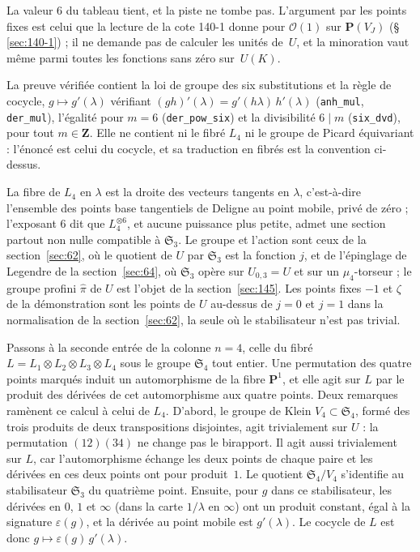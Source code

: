 \begin{remarque}
La valeur $6$ du tableau tient, et la piste ne tombe pas. L'argument par les points fixes est celui que la lecture de la cote 140-1 donne pour $\mathcal O(1)$ sur $\mathbf P(V_J)$ (§\,\ref{sec:140-1}) ; il ne demande pas de calculer les unités de~$U$, et la minoration vaut même parmi toutes les fonctions sans zéro sur~$U(K)$.
\end{remarque}

\noindent La preuve vérifiée contient la loi de groupe des six substitutions et la règle de cocycle, $g \mapsto g'(\lambda)$ vérifiant $(gh)'(\lambda) = g'(h\lambda)\,h'(\lambda)$ (\texttt{anh\_mul}, \texttt{der\_mul}), l'égalité pour $m = 6$ (\texttt{der\_pow\_six}) et la divisibilité $6 \mid m$ (\texttt{six\_dvd}), pour tout $m \in \mathbf Z$. Elle ne contient ni le fibré $L_4$ ni le groupe de Picard équivariant : l'énoncé est celui du cocycle, et sa traduction en fibrés est la convention ci-dessus.

\begin{remarque}
La fibre de $L_4$ en $\lambda$ est la droite des vecteurs tangents en $\lambda$, c'est-à-dire l'ensemble des points base tangentiels de Deligne \cite{deligne1989} au point mobile, privé de zéro ; l'exposant $6$ dit que $L_4^{\otimes 6}$, et aucune puissance plus petite, admet une section partout non nulle compatible à $\mathfrak S_3$. Le groupe et l'action sont ceux de la section~\ref{sec:62}, où le quotient de $U$ par $\mathfrak S_3$ est la fonction $j$, et de l'épinglage de Legendre de la section~\ref{sec:64}, où $\mathfrak S_3$ opère sur $U_{0,3} = U$ et sur un $\mu_4$-torseur ; le groupe profini $\hat\pi$ de $U$ est l'objet de la section~\ref{sec:145}. Les points fixes $-1$ et $\zeta$ de la démonstration sont les points de $U$ au-dessus de $j = 0$ et $j = 1$ dans la normalisation de la section~\ref{sec:62}, la seule où le stabilisateur n'est pas trivial.
\end{remarque}

Passons à la seconde entrée de la colonne $n = 4$, celle du fibré $L = L_1 \otimes L_2 \otimes L_3 \otimes L_4$ sous le groupe $\mathfrak S_4$ tout entier. Une permutation des quatre points marqués induit un automorphisme de la fibre $\mathbf P^1$, et elle agit sur $L$ par le produit des dérivées de cet automorphisme aux quatre points. Deux remarques ramènent ce calcul à celui de $L_4$. D'abord, le groupe de Klein $V_4 \subset \mathfrak S_4$, formé des trois produits de deux transpositions disjointes, agit trivialement sur $U$ : la permutation $(12)(34)$ ne change pas le birapport. Il agit aussi trivialement sur $L$, car l'automorphisme échange les deux points de chaque paire et les dérivées en ces deux points ont pour produit~$1$. Le quotient $\mathfrak S_4/V_4$ s'identifie au stabilisateur $\mathfrak S_3$ du quatrième point. Ensuite, pour $g$ dans ce stabilisateur, les dérivées en $0$, $1$ et $\infty$ (dans la carte $1/\lambda$ en $\infty$) ont un produit constant, égal à la signature $\varepsilon(g)$, et la dérivée au point mobile est $g'(\lambda)$. Le cocycle de $L$ est donc $g \mapsto \varepsilon(g)\, g'(\lambda)$.


